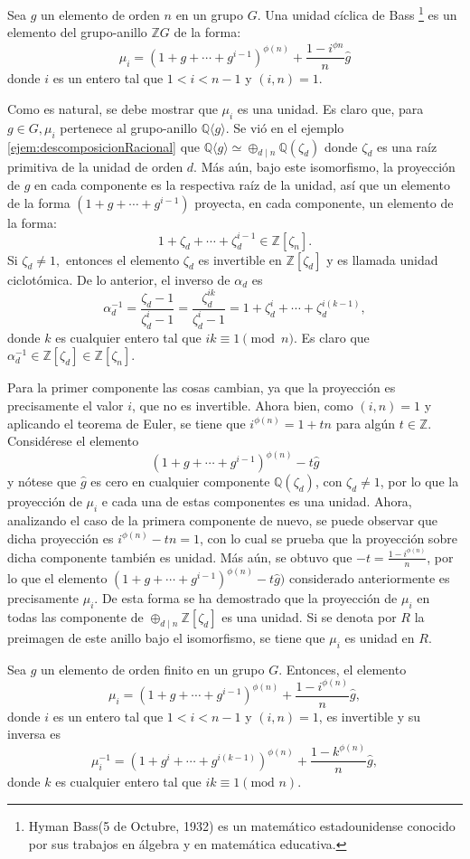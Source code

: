 \begin{definicion}
Sea $g$ un elemento de orden $n$ en un grupo $G$. Una unidad cíclica de Bass \footnote{Hyman Bass(5 de Octubre, 1932) es un matemático estadounidense conocido por sus trabajos en álgebra y en matemática educativa.  } es un elemento del grupo-anillo $\mathds{Z}G$ de la forma:
\[ \mu_{i} = (1+g+\cdots+g^{i-1})^{\phi(n)} + \frac{1-i^{\phi{n}}}{n}\hat{g}  \] donde $i$ es un entero tal que $1<i<n-1$ y $(i,n) = 1$.
\end{definicion}
Como es natural, se debe mostrar que $\mu_i$ es una unidad. Es claro que, para $g \in G, \mu_i$ pertenece al grupo-anillo $\mathds{Q} \langle g \rangle$. Se vió en el ejemplo \ref{ejem:descomposicionRacional} que $\mathds{Q}\langle g \rangle \simeq \oplus_{d \mid  n} \mathds{Q}(\zeta_d)$ donde $\zeta_d$ es una raíz primitiva de la unidad de orden $d$. Más aún, bajo este isomorfismo, la proyección de $g$ en cada componente es la respectiva raíz de la unidad, así que un elemento de la forma $(1+g+\cdots+g^{i-1})$ proyecta, en cada componente, un elemento de la forma: \[ 1+\zeta_d + \cdots +\zeta_d^{i-1} \in \mathds{Z}[\zeta_n].  \] Si $\zeta_d \neq 1,$ entonces el elemento $\zeta_d$ es invertible en $\mathds{Z}[\zeta_d]$ y es llamada unidad ciclotómica. De lo anterior, el inverso de $\alpha_d$ es \[ \alpha_d^{-1} = \frac{\zeta_d-1}{\zeta_d^i-1} = \frac{\zeta_d^{ik}}{\zeta_d^{i}-1} = 1+\zeta_d^i + \cdots + \zeta_d^{i(k-1)}, \] donde $k$ es cualquier entero tal que $ik \equiv 1 \pmod{n} $. Es claro que $\alpha_d^{-1} \in \mathds{Z}[\zeta_d] \in \mathds{Z}[\zeta_n]$.

Para la primer componente las cosas cambian, ya que la proyección es precisamente el valor $i$, que no es invertible. Ahora bien, como $(i,n) = 1$ y aplicando el teorema de Euler, se tiene que $i^{\phi(n)} = 1 + tn$ para algún $t \in \mathds{Z}$. Considérese el elemento \[  (1+g+\cdots +g^{i-1})^{\phi(n)} -t\hat{g} \] y nótese que $\hat{g}$ es cero en cualquier componente $\mathds{Q}(\zeta_d)$, con $\zeta_d \neq 1$, por lo que la proyección de $\mu_i$ e cada una de estas componentes es una unidad. Ahora, analizando el caso de la primera componente de nuevo, se puede observar que dicha proyección es $i^{\phi(n)}-tn = 1$, con lo cual se prueba que la proyección sobre dicha componente también es unidad. Más aún, se obtuvo que $-t = \frac{1-i^{\phi(n)}}{n}$, por lo que el elemento $(1+g+\cdots+g^{i-1})^{\phi(n)} -t\hat{g})$ considerado anteriormente es precisamente $\mu_i$. De esta forma se ha demostrado que la proyección de $\mu_i$ en todas las componente de $\oplus_{d \mid n}\mathds{Z}[\zeta_d]$ es una unidad. Si se denota por $R$ la preimagen de este anillo bajo el isomorfismo, se tiene que $\mu_i$ es unidad en $R$.
\begin{proposicion}
Sea $g$ un elemento de orden finito en un grupo $G$. Entonces, el elemento \[  \mu_i = (1+g+\cdots+g^{i-1})^{\phi(n)} + \frac{1-i^{\phi(n)}}{n}\hat{g}, \] donde $i$ es un entero tal que $1<i<n-1$ y $(i,n) = 1$, es invertible y su inversa es \[  \mu_i^{-1} = (1+g^i + \cdots + g^{i(k-1)})^{\phi(n)} + \frac{1-k^{\phi(n)}}{n}\hat{g},\] donde $k$ es cualquier entero tal que $ik \equiv 1 (\mbox{mod } n)$.
\end{proposicion}

